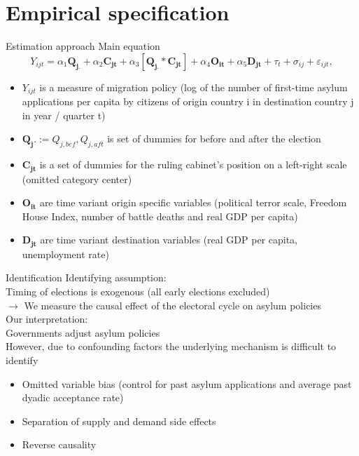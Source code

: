 \documentclass{beamer}
\begin{document}
\section{Empirical specification}
    \begin{frame}{Estimation approach}
Main equation
\begin{equation}
Y_{ijt} = \alpha_1 \mathbf{Q_{j.}} +\alpha_2  \mathbf{C_{jt}} +  \alpha_3  [\mathbf{Q_{j.}} *  \mathbf{C_{jt}}] + \alpha_4 \mathbf{O_{it}} + \alpha_5 \mathbf{D_{jt}} + \tau_t + \sigma_{ij} +  \varepsilon_{ijt},
\end{equation}
\vspace{-2ex}
\begin{itemize}
\item $Y_{ijt}$ is a measure of migration policy (log of the number of first-time asylum applications per capita by citizens of origin country i in destination country j in year / quarter t)
\item $\mathbf{Q_j.} := Q_{j,bef}, Q_{j,aft}$ is set of dummies for before and after the election
\item $\mathbf{C_{jt}}$ is a set of dummies for the ruling cabinet's position on a left-right scale (omitted category center)
\item $\mathbf{O_{it}}$ are time variant origin specific variables (political terror scale, Freedom House Index, number of battle deaths and real GDP per capita) 
\item $\mathbf{D_{jt}}$  are time variant destination variables (real GDP per capita, unemployment rate)
\end{itemize}
    \end{frame}
    \begin{frame}{Identification}
Identifying assumption:\\[1ex]
Timing of elections is exogenous (all early elections excluded)\\\vspace{.2cm}
$\rightarrow$ We measure the causal effect of the electoral cycle on asylum policies 
\\\vspace{.4cm}
Our interpretation:\\[1ex]
Governments adjust asylum policies 
\\\vspace{.4cm}
However, due to confounding factors the underlying mechanism is difficult to identify\\[1ex] 
\begin{itemize}
\item Omitted variable bias (control for past asylum applications and average past dyadic acceptance rate)\\[1ex] 
\item Separation of supply and demand side effects\\[1ex]
\item Reverse causality
\end{itemize}
	\end{frame}
	
\end{document}
